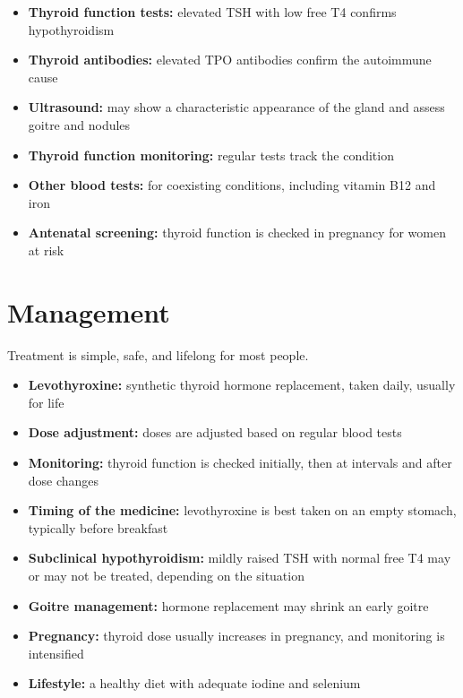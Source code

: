 \begin{itemize}
    \item \textbf{Thyroid function tests:} elevated TSH with low free T4 confirms hypothyroidism
    \item \textbf{Thyroid antibodies:} elevated TPO antibodies confirm the autoimmune cause
    \item \textbf{Ultrasound:} may show a characteristic appearance of the gland and assess goitre and nodules
    \item \textbf{Thyroid function monitoring:} regular tests track the condition
    \item \textbf{Other blood tests:} for coexisting conditions, including vitamin B12 and iron
    \item \textbf{Antenatal screening:} thyroid function is checked in pregnancy for women at risk
\end{itemize}

\section*{Management}
Treatment is simple, safe, and lifelong for most people.

\begin{itemize}
    \item \textbf{Levothyroxine:} synthetic thyroid hormone replacement, taken daily, usually for life
    \item \textbf{Dose adjustment:} doses are adjusted based on regular blood tests
    \item \textbf{Monitoring:} thyroid function is checked initially, then at intervals and after dose changes
    \item \textbf{Timing of the medicine:} levothyroxine is best taken on an empty stomach, typically before breakfast
    \item \textbf{Subclinical hypothyroidism:} mildly raised TSH with normal free T4 may or may not be treated, depending on the situation
    \item \textbf{Goitre management:} hormone replacement may shrink an early goitre
    \item \textbf{Pregnancy:} thyroid dose usually increases in pregnancy, and monitoring is intensified
    \item \textbf{Lifestyle:} a healthy diet with adequate iodine and selenium
\end{itemize}

